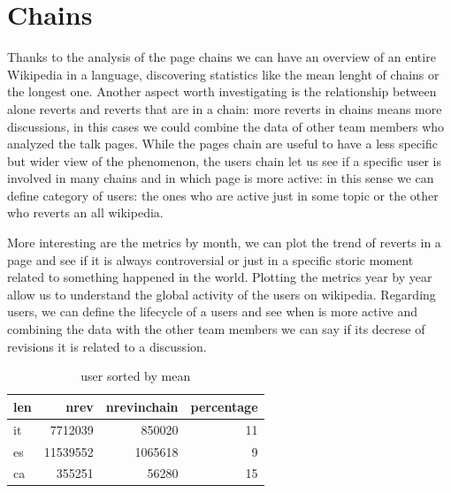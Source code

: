 \section{Chains}
Thanks to the analysis of the page chains we can have an overview of an entire Wikipedia in a language,
discovering statistics like the mean lenght of chains or the longest one. Another aspect worth
investigating is the relationship between alone reverts and reverts that are in a chain: more
reverts in chains means more discussions, in this cases we could combine the data of other team
members who analyzed the talk pages. While the pages chain are useful to have a less specific but
wider view of the phenomenon, the users chain let us see if a specific user is involved in many
chains and in which page is more active: in this sense we can define category of users: the ones who
are active just in some topic or the other who reverts an all wikipedia. 

More interesting are the metrics by month, we can plot the trend of reverts in a page and see if it
is always controversial or just in a specific storic moment related to something happened in the
world. Plotting the metrics year by year allow us to understand the global activity of the users on
wikipedia. Regarding users, we can define the lifecycle of a users and see when is more active and
combining the data with the other team members we can say if its decrese of revisions it is related
to a discussion.

\begin{table}[H]
    \centering
    \begin{tabularx}{\columnwidth}{@{}Xrrr@{}}
        \midrule
        \textbf{len}& \textbf{nrev} & \textbf{nrevinchain} & \textbf{percentage} \\ \toprule
        it & 7712039 & 850020 &  11 \\
        es & 11539552 & 1065618 & 9 \\
        ca & 355251 & 56280 & 15 \\
        
       
        
         \bottomrule
    \end{tabularx}
    
    \caption{user sorted by mean \label{table:mean}}
\end{table}


